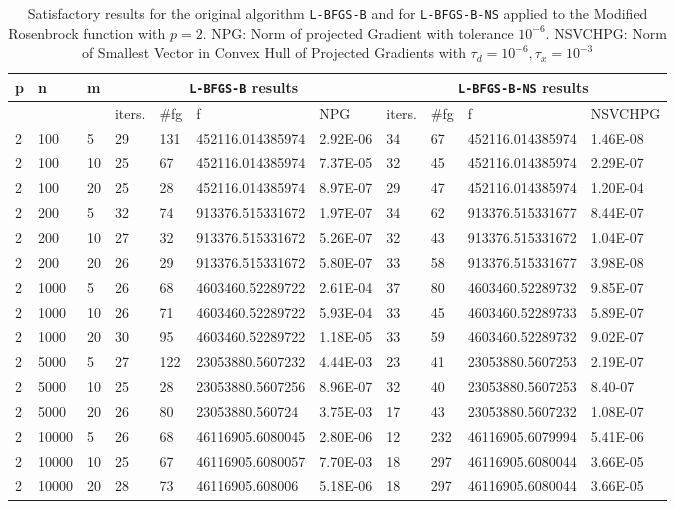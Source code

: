 \begin{center}
  \begin{table}
    \begin{center}
      \scriptsize
      \begin{tabular}{|l|l|l|l|l|l|l|l|l|l|l|}
        \hline
      p &  n  &  m  & \multicolumn{4}{|c|}{\texttt{L-BFGS-B} results} & \multicolumn{4}{|c|}{\texttt{L-BFGS-B-NS} results} \\ \hline
        & &  & iters. & \#fg & f & NPG & iters. & \#fg & f & NSVCHPG \\ \hline
      2 &  100 & 5 & 29 & 131 & 452116.014385974 & 2.92E-06 & 34 & 67 & 452116.014385974 & 1.46E-08\\
      2 &  100 & 10  & 25 & 67 & 452116.014385974 & 7.37E-05 & 32 & 45 & 452116.014385974 & 2.29E-07\\
      2 &  100 & 20  & 25 & 28 & 452116.014385974 & 8.97E-07 & 29 & 47 & 452116.014385974 & 1.20E-04\\
      2 &  200 & 5 & 32 & 74 & 913376.515331672 & 1.97E-07 & 34 & 62 & 913376.515331677 & 8.44E-07\\
      2 &  200 & 10  & 27 & 32 & 913376.515331672 & 5.26E-07 & 32 & 43 & 913376.515331672 & 1.04E-07\\
      2 &  200 & 20  & 26 & 29 & 913376.515331672 & 5.80E-07 & 33 & 58 & 913376.515331677 & 3.98E-08\\
      2 &  1000 & 5  & 26 & 68 & 4603460.52289722 & 2.61E-04 & 37 & 80 & 4603460.52289732 & 9.85E-07\\
      2 &  1000 & 10  & 26 & 71 & 4603460.52289722 & 5.93E-04 & 33 & 45 & 4603460.52289733 & 5.89E-07\\
      2 &  1000 & 20  & 30 & 95 & 4603460.52289722 & 1.18E-05 & 33 & 59 & 4603460.52289732 & 9.02E-07\\
      2 & 5000 & 5 & 27 & 122 & 23053880.5607232 & 4.44E-03 & 23 & 41 & 23053880.5607253 & 2.19E-07\\
      2 & 5000 & 10 & 25 & 28 & 23053880.5607256 & 8.96E-07 & 32 & 40 & 23053880.5607253 & 8.40-07\\
      2 & 5000 & 20 & 26 & 80 & 23053880.560724 & 3.75E-03 & 17 & 43 & 23053880.5607232 & 1.08E-07\\
      2 & 10000 & 5 & 26 & 68 & 46116905.6080045 & 2.80E-06 & 12 & 232 & 46116905.6079994 & 5.41E-06\\
      2 & 10000 & 10 & 25 & 67 & 46116905.6080057 & 7.70E-03 & 18 & 297 & 46116905.6080044 & 3.66E-05\\
      2 & 10000 & 20 & 28 & 73 & 46116905.608006 & 5.18E-06 & 18 & 297 & 46116905.6080044 & 3.66E-05\\
      \hline
      \end{tabular}
      \caption[Modified Rosenbrock with $p = 2$]{Satisfactory results for the original algorithm \texttt{L-BFGS-B}  and for \texttt{L-BFGS-B-NS} applied to the Modified Rosenbrock function with $p = 2$. NPG: Norm of projected Gradient with tolerance $10^{-6}$. 
NSVCHPG: Norm of Smallest Vector in Convex Hull of Projected Gradients with $\tau_d = 10^{-6}, \tau_x = 10^{-3}$}
      \label{pequal2}
    \end{center}
  \end{table}
\end{center}

